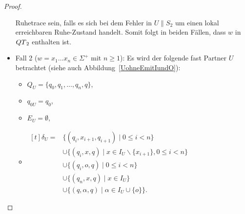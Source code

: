 \begin{proof}
\begin{itemize}
      Ruhetrace sein, falls es sich bei dem Fehler in $U\|S_2$ um einen lokal
      erreichbaren Ruhe-Zustand handelt. Somit folgt in beiden Fällen, dass $w$
      in $QT{}_2$ enthalten ist.
    \item Fall 2 ($w=x_1\dots x_n\in \Sigma ^+$ mit $n\geq 1$): Es wird der
      folgende fast Partner $U$ betrachtet (siehe auch
      Abbildung~\ref{UohneEmitIundO}):
      \begin{itemize}
        \item $Q_U=\{q_0,q_1,\dots ,q_n, q\}$,
        \item $q_{0U}=q_0$,
        \item $E_U=\emptyset$,
        \item $\begin{aligned}[t]
            \delta _U=&\{(q_i,x_{i+1},q_{i+1})\mid  0\leq i< n\}\\
                      &\cup\{(q_i,x,q)\mid  x\in I_U\backslash\{x_{i+1}\}, 0\leq i< n\}\\
                      &\cup\{(q_i,o,q)\mid 0\leq i< n\}\\
                      &\cup\{(q_n,x,q)\mid x\in I_U\}\\
                      &\cup\{(q,\alpha,q)\mid \alpha\in I_U\cup\{o\}\}.
        \end{aligned}$
      \end{itemize}
      \begin{figure} [h!tbp]
      \begin{center}
\end{center}
\end{figure}
\end{itemize}
\end{proof}
